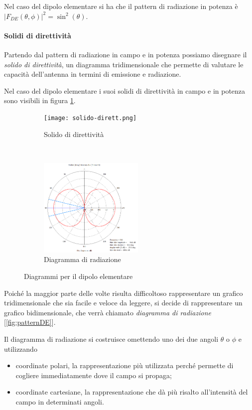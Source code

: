 Nel caso del dipolo elementare si ha che il pattern di radiazione in potenza è
$|F_{DE}(\theta,\phi)|^2 = \sin^2(\theta)$.

\paragraph{Solidi di direttività}
Partendo dal pattern di radiazione in campo e in potenza possiamo disegnare il \emph{solido di direttività}, un diagramma tridimensionale che permette di valutare le capacità dell'antenna in termini di emissione e radiazione.

Nel caso del dipolo elementare i suoi solidi di direttività in campo e in potenza sono visibili in figura \ref{fig:solidoDE}.
\begin{figure}[t!]
    \centering
    \begin{subfigure}[b]{0.5\textwidth}
        \centering
        \texttt{[image: solido-dirett.png]}
        \caption{Solido di direttività}
				\label{fig:solidoDE}
    \end{subfigure}%
    ~
    \begin{subfigure}[b]{0.5\textwidth}
        \centering
        \includegraphics[width=5cm]{img/pattern.png}
        \caption{Diagramma di radiazione}
				\label{fig:patternDE}
    \end{subfigure}
    \caption{Diagrammi per il dipolo elementare}
\end{figure}

Poiché la maggior parte delle volte risulta difficoltoso rappresentare un grafico tridimensionale che sia facile e veloce da leggere, si decide di rappresentare un grafico bidimensionale, che verrà chiamato \emph{diagramma di radiazione} [\autoref{fig:patternDE}].

Il diagramma di radiazione si costruisce omettendo uno dei due angoli $\theta$ o $\phi$ e utilizzando
\begin{itemize}
	\item coordinate polari, la rappresentazione più utilizzata perché permette di cogliere immediatamente dove il campo si propaga;
	\item coordinate cartesiane, la rappresentazione che dà più risalto all'intensità del campo in determinati angoli.
\end{itemize}

